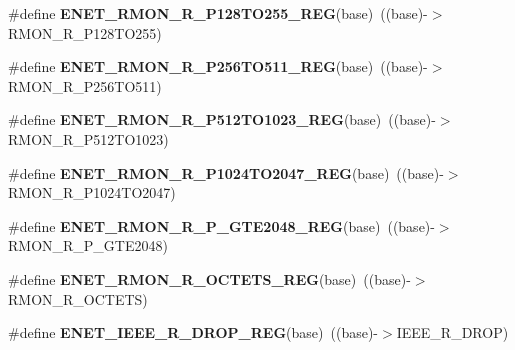 \begin{DoxyCompactItemize}
\item 
\#define {\bfseries E\+N\+E\+T\+\_\+\+R\+M\+O\+N\+\_\+\+R\+\_\+\+P128\+T\+O255\+\_\+\+R\+EG}(base)~((base)-\/$>$R\+M\+O\+N\+\_\+\+R\+\_\+\+P128\+T\+O255)\hypertarget{group__ENET__Register__Accessor__Macros_gab44d15a22c36cf909253d09685f6074a}{}\label{group__ENET__Register__Accessor__Macros_gab44d15a22c36cf909253d09685f6074a}

\item 
\#define {\bfseries E\+N\+E\+T\+\_\+\+R\+M\+O\+N\+\_\+\+R\+\_\+\+P256\+T\+O511\+\_\+\+R\+EG}(base)~((base)-\/$>$R\+M\+O\+N\+\_\+\+R\+\_\+\+P256\+T\+O511)\hypertarget{group__ENET__Register__Accessor__Macros_ga352e1b10b2c976bd3155713831144976}{}\label{group__ENET__Register__Accessor__Macros_ga352e1b10b2c976bd3155713831144976}

\item 
\#define {\bfseries E\+N\+E\+T\+\_\+\+R\+M\+O\+N\+\_\+\+R\+\_\+\+P512\+T\+O1023\+\_\+\+R\+EG}(base)~((base)-\/$>$R\+M\+O\+N\+\_\+\+R\+\_\+\+P512\+T\+O1023)\hypertarget{group__ENET__Register__Accessor__Macros_ga5efb8390da42bdb75581c0c08164a72c}{}\label{group__ENET__Register__Accessor__Macros_ga5efb8390da42bdb75581c0c08164a72c}

\item 
\#define {\bfseries E\+N\+E\+T\+\_\+\+R\+M\+O\+N\+\_\+\+R\+\_\+\+P1024\+T\+O2047\+\_\+\+R\+EG}(base)~((base)-\/$>$R\+M\+O\+N\+\_\+\+R\+\_\+\+P1024\+T\+O2047)\hypertarget{group__ENET__Register__Accessor__Macros_ga23988c015a3df975f33ea8a476ad1b18}{}\label{group__ENET__Register__Accessor__Macros_ga23988c015a3df975f33ea8a476ad1b18}

\item 
\#define {\bfseries E\+N\+E\+T\+\_\+\+R\+M\+O\+N\+\_\+\+R\+\_\+\+P\+\_\+\+G\+T\+E2048\+\_\+\+R\+EG}(base)~((base)-\/$>$R\+M\+O\+N\+\_\+\+R\+\_\+\+P\+\_\+\+G\+T\+E2048)\hypertarget{group__ENET__Register__Accessor__Macros_ga805f1dc9ea7f653db8d30f95c8b84103}{}\label{group__ENET__Register__Accessor__Macros_ga805f1dc9ea7f653db8d30f95c8b84103}

\item 
\#define {\bfseries E\+N\+E\+T\+\_\+\+R\+M\+O\+N\+\_\+\+R\+\_\+\+O\+C\+T\+E\+T\+S\+\_\+\+R\+EG}(base)~((base)-\/$>$R\+M\+O\+N\+\_\+\+R\+\_\+\+O\+C\+T\+E\+TS)\hypertarget{group__ENET__Register__Accessor__Macros_ga5e2ea20f4223e78adf4e727d4d33c342}{}\label{group__ENET__Register__Accessor__Macros_ga5e2ea20f4223e78adf4e727d4d33c342}

\item 
\#define {\bfseries E\+N\+E\+T\+\_\+\+I\+E\+E\+E\+\_\+\+R\+\_\+\+D\+R\+O\+P\+\_\+\+R\+EG}(base)~((base)-\/$>$I\+E\+E\+E\+\_\+\+R\+\_\+\+D\+R\+OP)\hypertarget{group__ENET__Register__Accessor__Macros_gaba8d35a5b6d0b054580c49fc237b2e7e}{}\label{group__ENET__Register__Accessor__Macros_gaba8d35a5b6d0b054580c49fc237b2e7e}


\end{DoxyCompactItemize}
